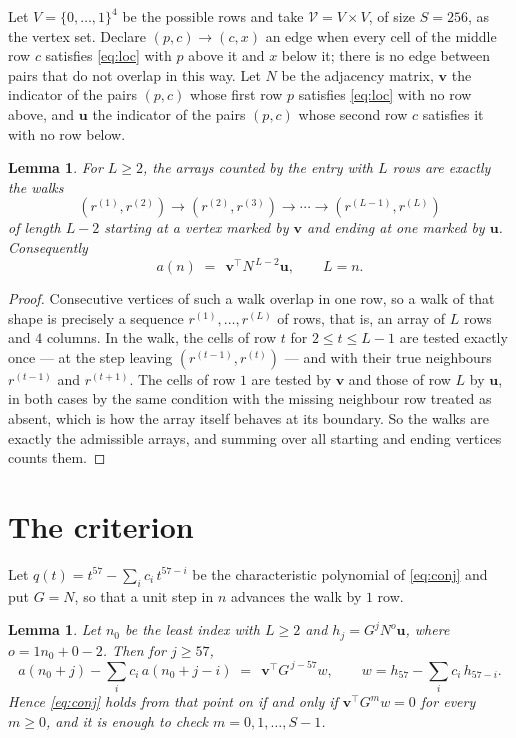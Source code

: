 \documentclass[11pt,a4paper]{article}
\theoremstyle{plain}
\newtheorem{lemma}[theorem]{Lemma}
\theoremstyle{definition}
\begin{document}
Let $V=\{0,\dots,1\}^{4}$ be the possible rows and take
$\mathcal V=V\times V$, of size $S=256$, as the vertex set. Declare $(p,c)\to(c,x)$ an edge
when every cell of the middle row $c$ satisfies \eqref{eq:loc} with $p$ above it and $x$
below it; there is no edge between pairs that do not overlap in this way. Let $N$ be the
adjacency matrix, $\mathbf{v}$ the indicator of the pairs $(p,c)$ whose first row $p$
satisfies \eqref{eq:loc} with no row above, and $\mathbf{u}$ the indicator of
the pairs $(p,c)$ whose second row $c$ satisfies it with no row below.

\begin{lemma}\label{lem:walk}
For $L\ge2$, the arrays counted by the entry with $L$ rows are exactly the walks
\[
(r^{(1)},r^{(2)})\to(r^{(2)},r^{(3)})\to\cdots\to(r^{(L-1)},r^{(L)})
\]
of length $L-2$ starting at a vertex marked by $\mathbf{v}$ and ending at one marked by
$\mathbf{u}$. Consequently
\[
a(n)\;=\;\,\mathbf{v}^{\!\top}N^{\,L-2}\mathbf{u},\qquad L=n .
\]
\end{lemma}

\begin{proof}
Consecutive vertices of such a walk overlap in one row, so a walk of that shape is
precisely a sequence $r^{(1)},\dots,r^{(L)}$ of rows, that is, an array of $L$ rows
and $4$ columns. In the walk, the cells of row $t$ for $2\le t\le L-1$ are tested
exactly once --- at the step leaving $(r^{(t-1)},r^{(t)})$ --- and with their true
neighbours $r^{(t-1)}$ and $r^{(t+1)}$. The cells of row $1$ are tested by
$\mathbf{v}$ and those of row $L$ by $\mathbf{u}$, in both cases by the same condition
with the missing neighbour row treated as absent, which is how the array itself behaves at
its boundary. So the walks are exactly the admissible arrays, and summing over all starting
and ending vertices counts them.
\end{proof}

\section{The criterion}

Let $q(t)=t^{57}-\sum_i c_i\,t^{57-i}$ be the characteristic polynomial of
\eqref{eq:conj} and put $G=N$, so that a unit step in $n$ advances the walk by
$1$ row.

\begin{lemma}\label{lem:crit}
Let $n_0$ be the least index with $L\ge2$ and $h_j=G^{j}N^{o}\mathbf{u}$, where
$o=1n_0+0-2$. Then for $j\ge57$,
\[
a(n_0+j)-\sum_i c_i\,a(n_0+j-i)\;=\;\,\mathbf{v}^{\!\top}G^{\,j-57}w,
\qquad w=h_{57}-\sum_i c_i\,h_{57-i} .
\]
Hence \eqref{eq:conj} holds from that point on if and only if
$\mathbf{v}^{\!\top}G^{m}w=0$ for every $m\ge0$, and it is enough to check
$m=0,1,\dots,S-1$.
\end{lemma}
\end{document}
